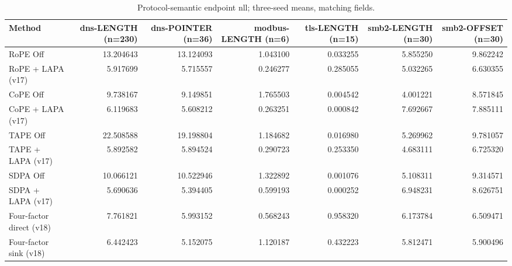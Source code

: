 \begin{table}[t]
\centering
\scriptsize
\caption{Protocol-semantic endpoint nll; three-seed means, matching fields.}
\begin{tabular}{lrrrrrr}
\toprule
Method & dns-LENGTH (n=230) & dns-POINTER (n=36) & modbus-LENGTH (n=6) & tls-LENGTH (n=15) & smb2-LENGTH (n=30) & smb2-OFFSET (n=30) \\
\midrule
RoPE Off & 13.204643 & 13.124093 & 1.043100 & 0.033255 & 5.855250 & 9.862242 \\
RoPE + LAPA (v17) & 5.917699 & 5.715557 & 0.246277 & 0.285055 & 5.032265 & 6.630355 \\
CoPE Off & 9.738167 & 9.149851 & 1.765503 & 0.004542 & 4.001221 & 8.571845 \\
CoPE + LAPA (v17) & 6.119683 & 5.608212 & 0.263251 & 0.000842 & 7.692667 & 7.885111 \\
TAPE Off & 22.508588 & 19.198804 & 1.184682 & 0.016980 & 5.269962 & 9.781057 \\
TAPE + LAPA (v17) & 5.892582 & 5.894524 & 0.290723 & 0.253350 & 4.683111 & 6.725320 \\
SDPA Off & 10.066121 & 10.522946 & 1.322892 & 0.001076 & 5.108311 & 9.314571 \\
SDPA + LAPA (v17) & 5.690636 & 5.394405 & 0.599193 & 0.000252 & 6.948231 & 8.626751 \\
Four-factor direct (v18) & 7.761821 & 5.993152 & 0.568243 & 0.958320 & 6.173784 & 6.509471 \\
Four-factor sink (v18) & 6.442423 & 5.152075 & 1.120187 & 0.432223 & 5.812471 & 5.900496 \\
\bottomrule
\end{tabular}
\end{table}
